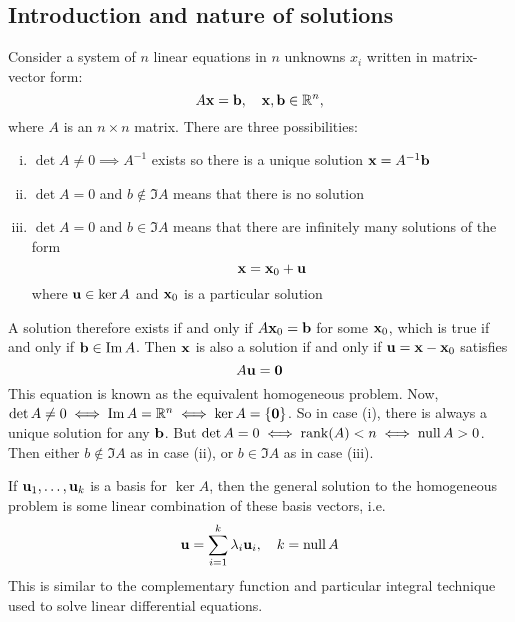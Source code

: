 \subsection{Introduction and nature of solutions}
Consider a system of \(n\) linear equations in \(n\) unknowns \(x_i\) written in matrix-vector form:
\[
	A\vb x = \vb b,\quad \vb x, \vb b \in \mathbb R^n,
\]
where \(A\) is an \(n \times n\) matrix.
There are three possibilities:
\begin{enumerate}[(i)]
	\item \(\det A \neq 0 \implies A^{-1}\) exists so there is a unique solution \(\vb x = A^{-1} \vb b\)
	\item \(\det A = 0\) and \(b \notin \Im A\) means that there is no solution
	\item \(\det A = 0\) and \(b \in \Im A\) means that there are infinitely many solutions of the form
	      \[
		      \vb x = \vb x_0 + \vb u
	      \]
	      where \(\vb u \in \ker A\) and \(\vb x_0\) is a particular solution
\end{enumerate}
A solution therefore exists if and only if \(A\vb x_0 = \vb b\) for some \(\vb x_0\), which is true if and only if \(\vb b \in \Im A\).
Then \(\vb x\) is also a solution if and only if \(\vb u = \vb x - \vb x_0\) satisfies
\[
	A\vb u = \vb 0
\]
This equation is known as the equivalent homogeneous problem.
Now, \(\det A \neq 0 \iff \Im A = \mathbb R^n \iff \ker A = \{ \vb 0 \}\).
So in case (i), there is always a unique solution for any \(\vb b\).
But \(\det A = 0 \iff \rank(A) < n \iff \operatorname{null} A > 0\).
Then either \(b \notin \Im A\) as in case (ii), or \(b \in \Im A\) as in case (iii).

If \(\vb u_1, \dots, \vb u_k\) is a basis for \(\ker A\), then the general solution to the homogeneous problem is some linear combination of these basis vectors, i.e.
\[
	\vb u = \sum_{i=1}^k \lambda_i \vb u_i,\quad k = \operatorname{null} A
\]
This is similar to the complementary function and particular integral technique used to solve linear differential equations.


